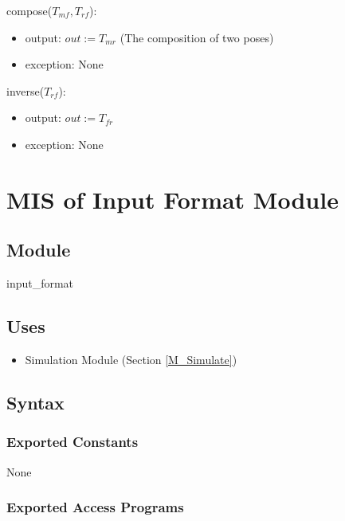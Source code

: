 \documentclass[12pt, titlepage]{article}
\begin{document}
\noindent compose($T_{mf}, T_{rf}$):
\begin{itemize}
    \item output: $out:= T_{mr}$ (The composition of two poses)
    \item exception: None
\end{itemize}

\noindent inverse($T_{rf}$):
\begin{itemize}
    \item output: $out:= T_{fr}$
    \item exception: None
\end{itemize}

\newpage

\section{MIS of Input Format Module} \label{M_Input} 



\subsection{Module}

input\_format

\subsection{Uses}
\begin{itemize}
  \item Simulation Module (Section \ref{M_Simulate})
\end{itemize}

\subsection{Syntax}

\subsubsection{Exported Constants}
None
\subsubsection{Exported Access Programs}
\end{document}
